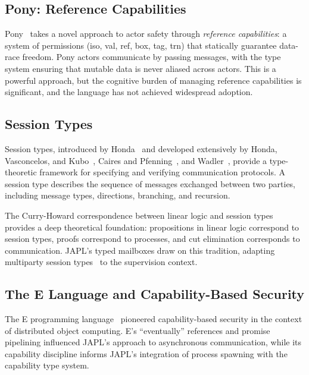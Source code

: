 \documentclass[11pt,a4paper]{article}
\begin{document}
\subsection{Pony: Reference Capabilities}

Pony~\citep{clebsch2015deny} takes a novel approach to actor safety through \emph{reference capabilities}: a system of permissions (iso, val, ref, box, tag, trn) that statically guarantee data-race freedom. Pony actors communicate by passing messages, with the type system ensuring that mutable data is never aliased across actors. This is a powerful approach, but the cognitive burden of managing reference capabilities is significant, and the language has not achieved widespread adoption.

\subsection{Session Types}

Session types, introduced by Honda~\citep{honda1993types} and developed extensively by Honda, Vasconcelos, and Kubo~\citep{honda1998language}, Caires and Pfenning~\citep{caires2010session}, and Wadler~\citep{wadler2012propositions}, provide a type-theoretic framework for specifying and verifying communication protocols. A session type describes the sequence of messages exchanged between two parties, including message types, directions, branching, and recursion.

The Curry-Howard correspondence between linear logic and session types~\citep{caires2010session,wadler2012propositions} provides a deep theoretical foundation: propositions in linear logic correspond to session types, proofs correspond to processes, and cut elimination corresponds to communication. JAPL's typed mailboxes draw on this tradition, adapting multiparty session types~\citep{honda2008multiparty} to the supervision context.

\subsection{The E Language and Capability-Based Security}

The E programming language~\citep{miller2006robust} pioneered capability-based security in the context of distributed object computing. E's ``eventually'' references and promise pipelining influenced JAPL's approach to asynchronous communication, while its capability discipline informs JAPL's integration of process spawning with the capability type system.
\end{document}
